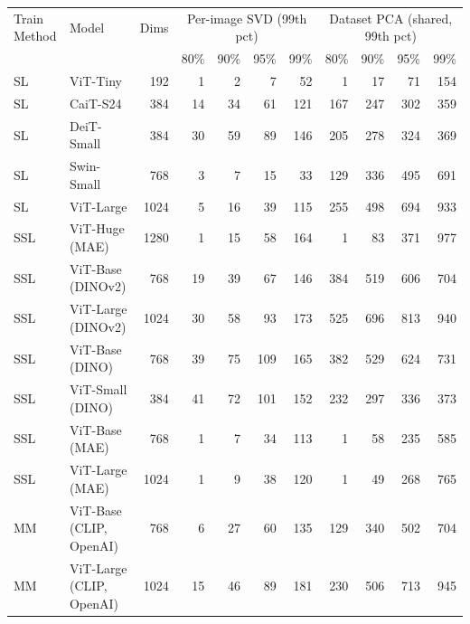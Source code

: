 \begin{tabular}{l l r r r r r r r r r}
\toprule
Train Method & Model & Dims & \multicolumn{4}{c}{Per-image SVD (99th pct)} & \multicolumn{4}{c}{Dataset PCA (shared, 99th pct)} \\
\cmidrule(lr){4-7}\cmidrule(lr){8-11}
 & & & 80\% & 90\% & 95\% & 99\% & 80\% & 90\% & 95\% & 99\% \\
\midrule
SL & ViT-Tiny & 192 & 1 & 2 & 7 & 52 & 1 & 17 & 71 & 154 \\
SL & CaiT-S24 & 384 & 14 & 34 & 61 & 121 & 167 & 247 & 302 & 359 \\
SL & DeiT-Small & 384 & 30 & 59 & 89 & 146 & 205 & 278 & 324 & 369 \\
SL & Swin-Small & 768 & 3 & 7 & 15 & 33 & 129 & 336 & 495 & 691 \\
SL & ViT-Large & 1024 & 5 & 16 & 39 & 115 & 255 & 498 & 694 & 933 \\
\midrule
SSL & ViT-Huge (MAE) & 1280 & 1 & 15 & 58 & 164 & 1 & 83 & 371 & 977 \\
SSL & ViT-Base (DINOv2) & 768 & 19 & 39 & 67 & 146 & 384 & 519 & 606 & 704 \\
SSL & ViT-Large (DINOv2) & 1024 & 30 & 58 & 93 & 173 & 525 & 696 & 813 & 940 \\
SSL & ViT-Base (DINO) & 768 & 39 & 75 & 109 & 165 & 382 & 529 & 624 & 731 \\
SSL & ViT-Small (DINO) & 384 & 41 & 72 & 101 & 152 & 232 & 297 & 336 & 373 \\
SSL & ViT-Base (MAE) & 768 & 1 & 7 & 34 & 113 & 1 & 58 & 235 & 585 \\
SSL & ViT-Large (MAE) & 1024 & 1 & 9 & 38 & 120 & 1 & 49 & 268 & 765 \\
\midrule
MM & ViT-Base (CLIP, OpenAI) & 768 & 6 & 27 & 60 & 135 & 129 & 340 & 502 & 704 \\
MM & ViT-Large (CLIP, OpenAI) & 1024 & 15 & 46 & 89 & 181 & 230 & 506 & 713 & 945 \\
\bottomrule
\end{tabular}